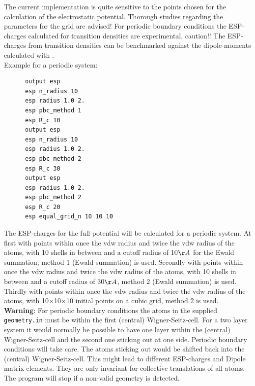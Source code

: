 The current implementation is quite sensitive to the points chosen for the calculation of the electrostatic potential. Thorough studies 
regarding the parameters for the grid are advised! For periodic boundary conditions the ESP-charges calculated for transition densities 
are experimental, caution!! The ESP-charges from transition densities can be benchmarked against the dipole-moments calculated with 
.\\
Example for a periodic system: 
\begin{verbatim}
      output esp
      esp n_radius 10
      esp radius 1.0 2.
      esp pbc_method 1
      esp R_c 10
      output esp
      esp n_radius 10
      esp radius 1.0 2.
      esp pbc_method 2
      esp R_c 30
      output esp
      esp radius 1.0 2.
      esp pbc_method 2
      esp R_c 20
      esp equal_grid_n 10 10 10
\end{verbatim}
The ESP-charges for the full potential will be calculated for a periodic system. At first with points within once the vdw radius 
and twice the vdw radius of the atoms, with 10 shells in between and a cutoff radius of 10$\AA$ for the Ewald summation, method 1 
(Ewald summation) is used. Secondly with points within once the vdw radius and twice the vdw radius of the atoms, with 10 shells in 
between and a cutoff radius of 30$\AA$, method 2 (Ewald summation) is used. Thirdly with points within once the vdw radius and twice 
the vdw radius of the atoms, with 10$\times$10$\times$10 initial points on a cubic grid, method 2 is used.\\

\textbf{Warning}: For periodic boundary conditions the atoms in the supplied \texttt{geometry.in} must be within the first (central) Wigner-Seitz-cell. 
For a two layer system it would normally be possible to have one layer within the (central) Wigner-Seitz-cell and the second one sticking out at 
one side. Periodic boundary conditions will take care. The atoms sticking out would be shifted back into the (central) Wigner-Seitz-cell. 
This might lead to different ESP-charges and Dipole matrix elements. They are only invariant for collective translations of all atoms. 
The program will stop if a non-valid geometry is detected.
\newpage


